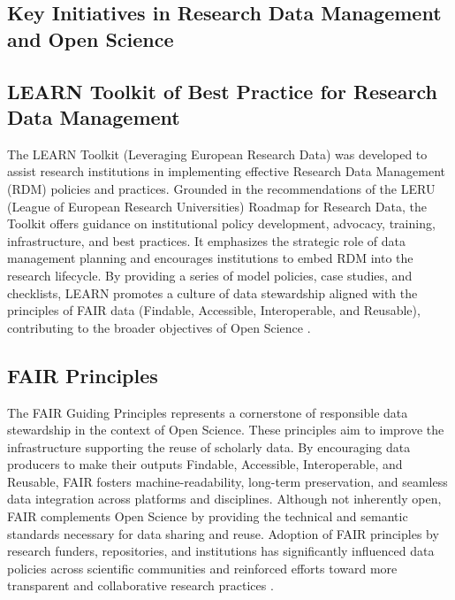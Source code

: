 \documentclass{article}
\begin{document}
\subsection{Key Initiatives in Research Data Management and Open Science}

\subsection{LEARN Toolkit of Best Practice for Research Data Management}
The LEARN Toolkit (Leveraging European Research Data) was developed to assist research institutions in implementing effective Research Data Management (RDM) policies and practices. Grounded in the recommendations of the LERU (League of European Research Universities) Roadmap for Research Data, the Toolkit offers guidance on institutional policy development, advocacy, training, infrastructure, and best practices. It emphasizes the strategic role of data management planning and encourages institutions to embed RDM into the research lifecycle. By providing a series of model policies, case studies, and checklists, LEARN promotes a culture of data stewardship aligned with the principles of FAIR data (Findable, Accessible, Interoperable, and Reusable), contributing to the broader objectives of Open Science \cite{learn_2017}.

\subsection{FAIR Principles}
The FAIR Guiding Principles represents a cornerstone of responsible data stewardship in the context of Open Science. These principles aim to improve the infrastructure supporting the reuse of scholarly data. By encouraging data producers to make their outputs Findable, Accessible, Interoperable, and Reusable, FAIR fosters machine-readability, long-term preservation, and seamless data integration across platforms and disciplines. Although not inherently open, FAIR complements Open Science by providing the technical and semantic standards necessary for data sharing and reuse. Adoption of FAIR principles by research funders, repositories, and institutions has significantly influenced data policies across scientific communities and reinforced efforts toward more transparent and collaborative research practices \cite{wilkinson_fair_2016}.
\end{document}
